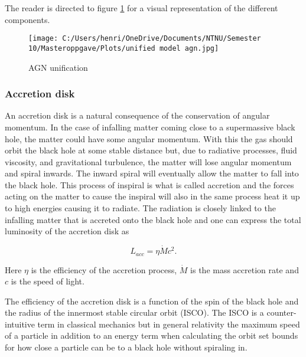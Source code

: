 The reader is directed to figure \ref{fig:my_label} for a visual representation of the different components.


\begin{figure}
    \centering
    \texttt{[image: C:/Users/henri/OneDrive/Documents/NTNU/Semester 10/Masteroppgave/Plots/unified model agn.jpg]}
    \caption{AGN unification}
    \label{fig:my_label}
\end{figure}

\subsubsection{Accretion disk}
An accretion disk is a natural consequence of the conservation of angular momentum. In the case of infalling 
matter coming close to a supermassive black hole, the matter could have some angular momentum. With this the gas should orbit the black hole at some stable distance but, due to radiative processes, fluid viscosity, and gravitational turbulence, 
the matter will lose angular momentum and spiral inwards. The inward spiral will eventually allow the matter to fall into the black hole. 
This process of inspiral is what is called accretion and the forces acting on the matter to cause the inspiral 
will also in the same process heat it up to high energies causing it to radiate. The radiation is closely linked to the 
infalling matter that is accreted onto the black hole and one can express the total luminosity of the accretion disk as 

\begin{equation}
    L_{acc} = \eta \dot{M}c^2.
    \label{eq:accretion_luminosity}
\end{equation}

Here $\eta$ is the efficiency of the accretion process, $\dot{M}$ is the mass accretion rate and $c$ is the speed of light.

The efficiency of the accretion disk is a function of the spin of the black hole and the radius of the innermost stable circular orbit (ISCO).
The ISCO is a counter-intuitive term in classical mechanics but in general relativity the maximum speed of a particle 
in addition to an energy term when calculating the orbit set bounds for how close a particle can be to 
a black hole without spiraling in. %




